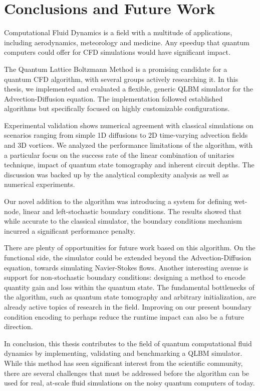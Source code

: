 \chapter{Conclusions and Future Work}
\label{chapter:conclusions}

Computational Fluid Dynamics is a field with a multitude of applications, including aerodynamics, meteorology and medicine.
Any speedup that quantum computers could offer for CFD simulations would have significant impact.

The Quantum Lattice Boltzmann Method is a promising candidate for a quantum CFD algorithm, with several groups actively researching it.
In this thesis, we implemented and evaluated a flexible, generic QLBM simulator for the Advection-Diffusion equation.
The implementation followed established algorithms but specifically focused on highly customizable configurations.

Experimental validation shows numerical agreement with classical simulations on scenarios ranging from simple 1D diffusions to 2D time-varying advection fields and 3D vortices. 
We analyzed the performance limitations of the algorithm, with a particular focus on the success rate of the linear combination of unitaries technique, impact of quantum state tomography and inherent circuit depths.
The discussion was backed up by the analytical complexity analysis as well as numerical experiments.

Our novel addition to the algorithm was introducing a system for defining wet-node, linear and left-stochastic boundary conditions.
The results showed that while accurate to the classical simulator, the boundary conditions mechanism incurred a significant performance penalty.

There are plenty of opportunities for future work based on this algorithm.
On the functional side, the simulator could be extended beyond the Advection-Diffusion equation, towards simulating Navier-Stokes flows.
Another interesting avenue is support for non-stochastic boundary conditions: designing a method to encode quantity gain and loss within the quantum state.
The fundamental bottlenecks of the algorithm, such as quantum state tomography and arbitrary initialization, are already active topics of research in the field.
Improving on our present boundary condition encoding to perhaps reduce the runtime impact can also be a future direction.

In conclusion, this thesis contributes to the field of quantum computational fluid dynamics by implementing, validating and benchmarking a QLBM simulator.
While this method has seen significant interest from the scientific community, there are several challenges that must be addressed before the algorithm can be used for real, at-scale fluid simulations on the noisy quantum computers of today.